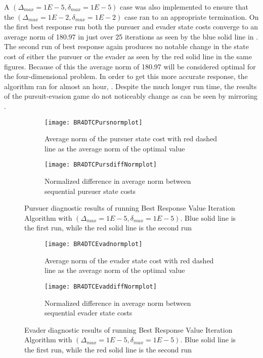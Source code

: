 A $(\Delta_{max} = 1E-5,\delta_{max} = 1E-5)$ case was also implemented to ensure that the $(\Delta_{max} = 1E-2,\delta_{max} = 1E-2)$ case ran to an appropriate termination. On the first best response run both the pursuer and evader state costs converge to an average norm of 180.97 in just over 25 iterations as seen by the blue solid line in . The second run of best response again produces no notable change in the state cost of either the pursuer or the evader as seen by the red solid line in the same figures. Because of this the average norm of 180.97 will be considered optimal for the four-dimensional problem. In order to get this more accurate response, the algorithm ran for almost an hour, . Despite the much longer run time, the results of the pursuit-evasion game do not noticeably change as can be seen by  mirroring . 
\begin{figure}[h!]
\centering
\begin{subfigure}[t]{0.475\textwidth}
	\centering
	\texttt{[image: BR4DTCPursnormplot]}
	\caption{Average norm of the pursuer state cost with red dashed line as the average norm of the optimal value}
	\label{BR4DTCPnp}
\end{subfigure}
\hfill
\begin{subfigure}[t]{0.475\textwidth}
	\centering
	\texttt{[image: BR4DTCPursdiffNormplot]}
	\caption{Normalized difference in average norm between sequential pursuer state costs}
	\label{BR4DTCPdnp}
\end{subfigure}
\caption{Pursuer diagnostic results of running Best Response Value Iteration Algorithm with $(\Delta_{max} = 1E-5,\delta_{max} = 1E-5)$. Blue solid line is the first run, while the red solid line is the second run}
\label{BR4DTCPdiag}
\end{figure}
\begin{figure}[h!]
\centering
\begin{subfigure}[t]{0.475\textwidth}
	\centering
	\texttt{[image: BR4DTCEvadnormplot]}
	\caption{Average norm of the evader state cost with red dashed line as the average norm of the optimal value}
	\label{BR4DTCEnp}
\end{subfigure}
\hfill
\begin{subfigure}[t]{0.475\textwidth}
	\centering
	\texttt{[image: BR4DTCEvaddiffNormplot]}
	\caption{Normalized difference in average norm between sequential evader state costs}
	\label{BR4DTCEdnp}
\end{subfigure}
\caption{Evader diagnostic results of running Best Response Value Iteration Algorithm with $(\Delta_{max} = 1E-5,\delta_{max} = 1E-5)$. Blue solid line is the first run, while the red solid line is the second run}
\label{BR4DTCEdiag}
\end{figure}
